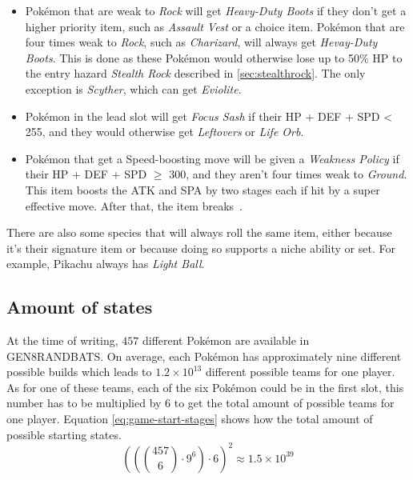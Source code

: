 \begin{itemize}
{	Vest} if their \ac{HP} + \ac{DEF} + \ac{SPD} $\geq$ 235. Otherwise, \textit{Expert Belt},
	\textit{Leftovers} or \textit{Life Orb} is generated.
	\item Pokémon that are weak to \textit{Rock} will get \textit{Heavy-Duty Boots} if they don't get a 
	higher priority item, such as \textit{Assault Vest} or a choice item. Pokémon that are four
	times weak to \textit{Rock}, such as \textit{Charizard}, will always get \textit{Hevay-Duty Boots}.
	This is done as these Pokémon would otherwise lose up to 50\% \ac{HP} to the entry hazard
	\textit{Stealth Rock} described in \ref{sec:stealthrock}. The only exception is \textit{Scyther},
	which can get \textit{Eviolite}.
	\item Pokémon in the lead slot will get \textit{Focus Sash} if their \ac{HP} + \ac{DEF} + \ac{SPD} < 255,
	and they would otherwise get \textit{Leftovers} or \textit{Life Orb}.
	\item Pokémon that get a Speed-boosting move will be given a \textit{Weakness Policy} if their \ac{HP}
	+ \ac{DEF} + \ac{SPD} $\geq$ 300, and they aren't four times weak to \textit{Ground}. This item
	boosts the \ac{ATK} and \ac{SPA} by two stages each if hit by a super effective move. After that,
	the item breaks~\autocite{Bulbapedia:WeaknessPolicy}.
\end{itemize}
There are also some species that will always roll the same item, either because it's their signature item or
because doing so supports a niche ability or set. For example, Pikachu always has \textit{Light Ball}.

\subsection{Amount of states}
\label{sec:amout-states}
At the time of writing, $457$ different Pokémon are available in \ac{GEN8RANDBATS}. On average,
each Pokémon has approximately nine different possible builds which leads to $1.2 \times 10^{13}$ different
possible teams for one player. As for one of these teams, each of the six Pokémon could be in the first slot,
this number has to be multiplied by 6 to get the total amount of possible teams for one player. Equation
\ref{eq:game-start-stages} shows how the total amount of possible starting states.
\begin{equation}
\label{eq:game-start-stages}
	\left( \left( \binom{457}{6} \cdot 9^6\right) \cdot 6\right)^2 \approx 1.5 \times 10^{39}
\end{equation} 

